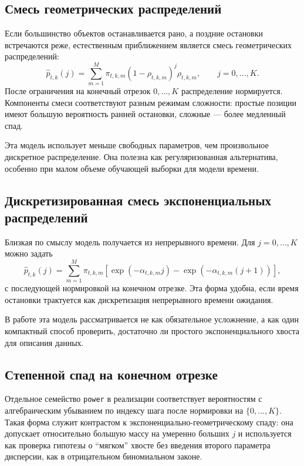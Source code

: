 \subsection{Смесь геометрических распределений}

Если большинство объектов останавливается рано, а поздние остановки встречаются реже, естественным приближением является смесь геометрических распределений:
\begin{equation}
  \widehat p_{t,k}(j)=\sum_{m=1}^{M}\pi_{t,k,m}(1-\rho_{t,k,m})^j\rho_{t,k,m},
  \qquad j=0,\ldots,K.
  \label{eq:geometric_mixture}
\end{equation}
После ограничения на конечный отрезок \(0,\ldots,K\) распределение нормируется. Компоненты смеси соответствуют разным режимам сложности: простые позиции имеют большую вероятность ранней остановки, сложные --- более медленный спад.

Эта модель использует меньше свободных параметров, чем произвольное дискретное распределение. Она полезна как регуляризованная альтернатива, особенно при малом объеме обучающей выборки для модели времени.

\subsection{Дискретизированная смесь экспоненциальных распределений}

Близкая по смыслу модель получается из непрерывного времени. Для \(j=0,\ldots,K\) можно задать
\begin{equation}
  \widehat p_{t,k}(j)=\sum_{m=1}^{M}\pi_{t,k,m}
  \left[\exp(-\alpha_{t,k,m}j)-\exp(-\alpha_{t,k,m}(j+1))\right],
  \label{eq:exponential_mixture}
\end{equation}
с последующей нормировкой на конечном отрезке. Эта форма удобна, если время остановки трактуется как дискретизация непрерывного времени ожидания.

В работе эта модель рассматривается не как обязательное усложнение, а как один компактный способ проверить, достаточно ли простого экспоненциального хвоста для описания данных.

\subsection{Степенной спад на конечном отрезке}

Отдельное семейство \texttt{power} в реализации соответствует вероятностям с алгебраическим убыванием по индексу шага после нормировки на \(\{0,\ldots,K\}\). Такая форма служит контрастом к экспоненциально-геометрическому спаду: она допускает относительно большую массу на умеренно больших \(j\) и используется как проверка гипотезы о ``мягком'' хвосте без введения второго параметра дисперсии, как в отрицательном биномиальном законе.

